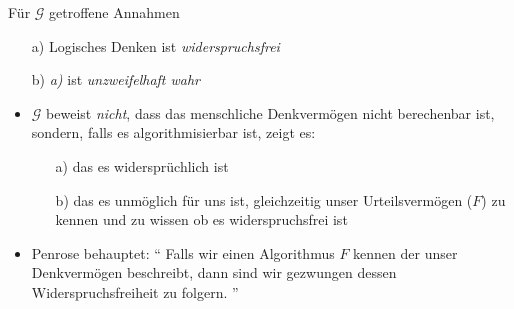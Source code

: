 \begin{frame}
    \begin{block}{Für $\mathscr{G}$ getroffene Annahmen}
        \begin{itemize}
            \item[a)] Logisches Denken ist \emph{widerspruchsfrei}
            \item[b)] \emph{a)} ist \emph{unzweifelhaft wahr}
        \end{itemize}
    \end{block}
    \begin{itemize}
        \item $\mathscr{G}$ beweist \emph{nicht}, dass das menschliche Denkvermögen nicht berechenbar ist, sondern, falls es algorithmisierbar ist, zeigt es:
        \begin{itemize}
            \item[a)] das es widersprüchlich ist
            \item[b)] das es unmöglich für uns ist, gleichzeitig unser Urteilsvermögen ($F$) zu kennen und zu wissen ob es widerspruchsfrei ist
        \end{itemize}
        \item Penrose behauptet:
        \enquote{
            Falls wir einen Algorithmus $F$ kennen der unser Denkvermögen beschreibt, dann sind wir gezwungen dessen Widerspruchsfreiheit zu folgern.
        }
    \end{itemize}
\end{frame}

